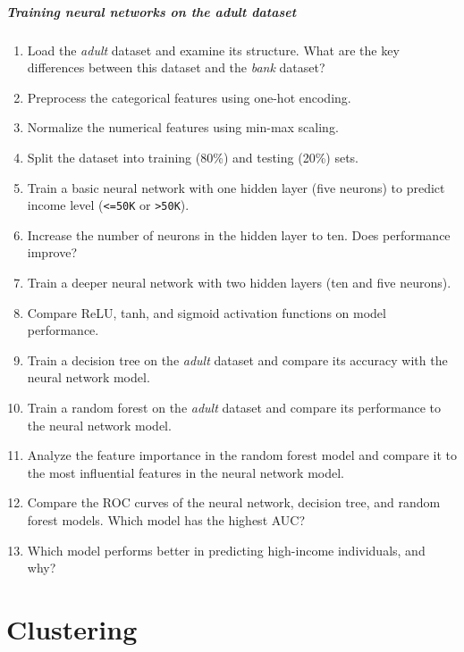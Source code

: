 \documentclass[
]{book}
\newcommand{\passthrough}[1]{#1}
\providecommand{\tightlist}{%
  \setlength{\itemsep}{0pt}\setlength{\parskip}{0pt}}
\theoremstyle{definition}
\theoremstyle{definition}
\theoremstyle{definition}
\theoremstyle{definition}
\theoremstyle{remark}
\begin{document}
\paragraph*{\texorpdfstring{Training neural networks on the \emph{adult} dataset}{Training neural networks on the adult dataset}}\label{training-neural-networks-on-the-adult-dataset}

\begin{enumerate}
\def\labelenumi{\arabic{enumi}.}
\setcounter{enumi}{28}
\tightlist
\item
  Load the \emph{adult} dataset and examine its structure. What are the key differences between this dataset and the \emph{bank} dataset?
\item
  Preprocess the categorical features using one-hot encoding.
\item
  Normalize the numerical features using min-max scaling.
\item
  Split the dataset into training (80\%) and testing (20\%) sets.
\item
  Train a basic neural network with one hidden layer (five neurons) to predict income level (\passthrough{\lstinline!<=50K!} or \passthrough{\lstinline!>50K!}).
\item
  Increase the number of neurons in the hidden layer to ten. Does performance improve?
\item
  Train a deeper neural network with two hidden layers (ten and five neurons).
\item
  Compare ReLU, tanh, and sigmoid activation functions on model performance.
\item
  Train a decision tree on the \emph{adult} dataset and compare its accuracy with the neural network model.
\item
  Train a random forest on the \emph{adult} dataset and compare its performance to the neural network model.
\item
  Analyze the feature importance in the random forest model and compare it to the most influential features in the neural network model.
\item
  Compare the ROC curves of the neural network, decision tree, and random forest models. Which model has the highest AUC?
\item
  Which model performs better in predicting high-income individuals, and why?
\end{enumerate}

\chapter{Clustering}\label{chapter-cluster}
\end{document}
